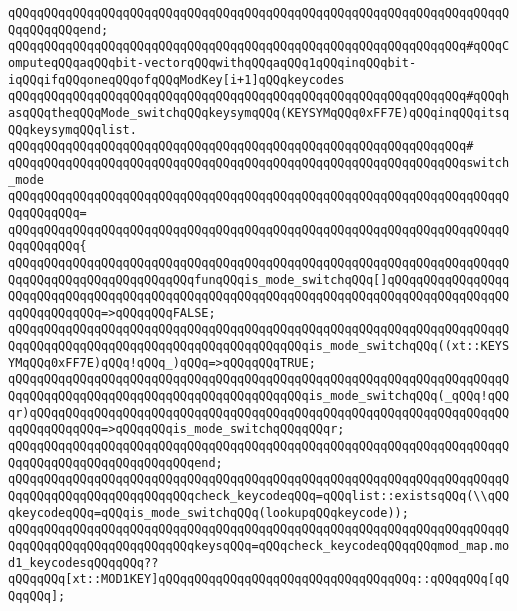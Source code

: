 \verb|qQQqqQQqqQQqqQQqqQQqqQQqqQQqqQQqqQQqqQQqqQQqqQQqqQQqqQQqqQQqqQQqqQQqqQQqqQQqqQQqend;|\newline
\newline
\verb|qQQqqQQqqQQqqQQqqQQqqQQqqQQqqQQqqQQqqQQqqQQqqQQqqQQqqQQqqQQqqQQq#qQQqComputeqQQqaqQQqbit-vectorqQQqwithqQQqaqQQq1qQQqinqQQqbit-iqQQqifqQQqoneqQQqofqQQqModKey[i+1]qQQqkeycodes|\newline
\verb|qQQqqQQqqQQqqQQqqQQqqQQqqQQqqQQqqQQqqQQqqQQqqQQqqQQqqQQqqQQqqQQq#qQQqhasqQQqtheqQQqMode_switchqQQqkeysymqQQq(KEYSYMqQQq0xFF7E)qQQqinqQQqitsqQQqkeysymqQQqlist.|\newline
\verb|qQQqqQQqqQQqqQQqqQQqqQQqqQQqqQQqqQQqqQQqqQQqqQQqqQQqqQQqqQQqqQQq#|\newline
\verb|qQQqqQQqqQQqqQQqqQQqqQQqqQQqqQQqqQQqqQQqqQQqqQQqqQQqqQQqqQQqqQQqswitch_mode|\newline
\verb|qQQqqQQqqQQqqQQqqQQqqQQqqQQqqQQqqQQqqQQqqQQqqQQqqQQqqQQqqQQqqQQqqQQqqQQqqQQqqQQq=|\newline
\verb|qQQqqQQqqQQqqQQqqQQqqQQqqQQqqQQqqQQqqQQqqQQqqQQqqQQqqQQqqQQqqQQqqQQqqQQqqQQqqQQq{|\newline
\verb|qQQqqQQqqQQqqQQqqQQqqQQqqQQqqQQqqQQqqQQqqQQqqQQqqQQqqQQqqQQqqQQqqQQqqQQqqQQqqQQqqQQqqQQqqQQqqQQqfunqQQqis_mode_switchqQQq[]qQQqqQQqqQQqqQQqqQQqqQQqqQQqqQQqqQQqqQQqqQQqqQQqqQQqqQQqqQQqqQQqqQQqqQQqqQQqqQQqqQQqqQQqqQQqqQQqqQQq=>qQQqqQQqFALSE;|\newline
\verb|qQQqqQQqqQQqqQQqqQQqqQQqqQQqqQQqqQQqqQQqqQQqqQQqqQQqqQQqqQQqqQQqqQQqqQQqqQQqqQQqqQQqqQQqqQQqqQQqqQQqqQQqqQQqqQQqis_mode_switchqQQq((xt::KEYSYMqQQq0xFF7E)qQQq!qQQq_)qQQq=>qQQqqQQqTRUE;|\newline
\verb|qQQqqQQqqQQqqQQqqQQqqQQqqQQqqQQqqQQqqQQqqQQqqQQqqQQqqQQqqQQqqQQqqQQqqQQqqQQqqQQqqQQqqQQqqQQqqQQqqQQqqQQqqQQqqQQqis_mode_switchqQQq(_qQQq!qQQqr)qQQqqQQqqQQqqQQqqQQqqQQqqQQqqQQqqQQqqQQqqQQqqQQqqQQqqQQqqQQqqQQqqQQqqQQqqQQqqQQq=>qQQqqQQqis_mode_switchqQQqqQQqr;|\newline
\verb|qQQqqQQqqQQqqQQqqQQqqQQqqQQqqQQqqQQqqQQqqQQqqQQqqQQqqQQqqQQqqQQqqQQqqQQqqQQqqQQqqQQqqQQqqQQqqQQqend;|\newline
\newline
\verb|qQQqqQQqqQQqqQQqqQQqqQQqqQQqqQQqqQQqqQQqqQQqqQQqqQQqqQQqqQQqqQQqqQQqqQQqqQQqqQQqqQQqqQQqqQQqqQQqcheck_keycodeqQQq=qQQqlist::existsqQQq(\\qQQqkeycodeqQQq=qQQqis_mode_switchqQQq(lookupqQQqkeycode));|\newline
\newline
\verb|qQQqqQQqqQQqqQQqqQQqqQQqqQQqqQQqqQQqqQQqqQQqqQQqqQQqqQQqqQQqqQQqqQQqqQQqqQQqqQQqqQQqqQQqqQQqqQQqkeysqQQq=qQQqcheck_keycodeqQQqqQQqmod_map.mod1_keycodesqQQqqQQq??qQQqqQQq[xt::MOD1KEY]qQQqqQQqqQQqqQQqqQQqqQQqqQQqqQQqqQQq::qQQqqQQq[qQQqqQQq];|\newline

